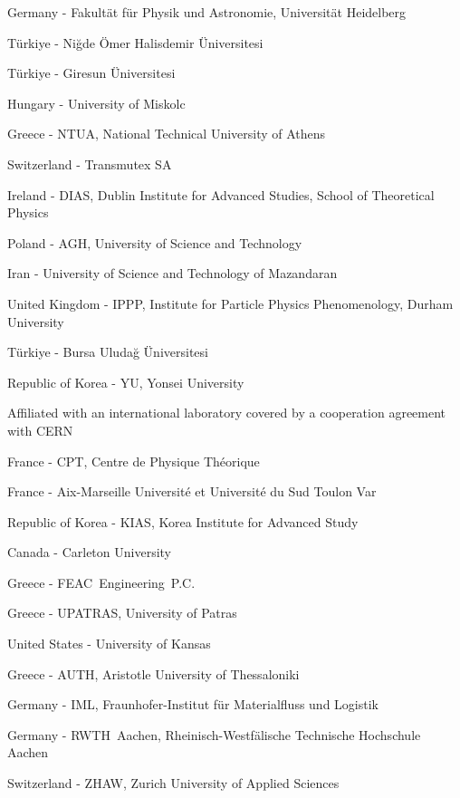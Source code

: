 \item[$^{264}$] Germany - Fakult{\"a}t f{\"u}r Physik und Astronomie, Universit{\"a}t Heidelberg
\item[$^{265}$] T{\"u}rkiye - Ni{\u g}de {\"O}mer Halisdemir {\"U}niversitesi
\item[$^{266}$] T{\"u}rkiye - Giresun {\"U}niversitesi
\item[$^{267}$] Hungary - University of Miskolc
\item[$^{268}$] Greece - NTUA, National Technical University of Athens
\item[$^{269}$] Switzerland - Transmutex SA
\item[$^{270}$] Ireland - DIAS, Dublin Institute for Advanced Studies, School of Theoretical Physics
\item[$^{271}$] Poland - AGH, University of Science and Technology
\item[$^{272}$] Iran - University of Science and Technology of Mazandaran
\item[$^{273}$] United Kingdom - IPPP, Institute for Particle Physics Phenomenology, Durham University
\item[$^{274}$] T{\"u}rkiye - Bursa Uluda{\u g} {\"U}niversitesi
\item[$^{275}$] Republic of Korea - YU, Yonsei University
\item[$^{276}$] Affiliated with an international laboratory covered by a cooperation agreement with CERN
\item[$^{277}$] France - CPT, Centre de Physique Th\'eorique
\item[$^{278}$] France - Aix-Marseille Universit{\'e} et Universit{\'e} du Sud Toulon Var
\item[$^{279}$] Republic of Korea - KIAS, Korea Institute for Advanced Study
\item[$^{280}$] Canada - Carleton University
\item[$^{281}$] Greece - FEAC~Engineering~P.C.
\item[$^{282}$] Greece - UPATRAS, University of Patras
\item[$^{283}$] United States - University of Kansas
\item[$^{284}$] Greece - AUTH, Aristotle University of Thessaloniki
\item[$^{285}$] Germany - IML, Fraunhofer-Institut f{\"u}r Materialfluss und Logistik 
\item[$^{286}$] Germany - RWTH~Aachen, Rheinisch-Westf{\"a}lische Technische Hochschule Aachen
\item[$^{287}$] Switzerland - ZHAW, Zurich University of Applied Sciences
